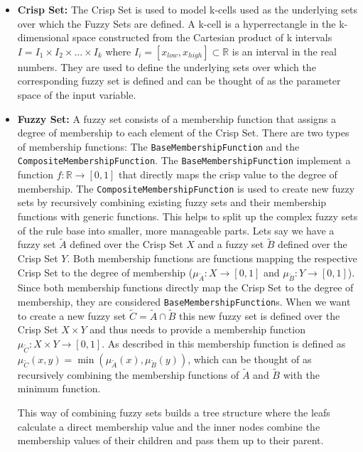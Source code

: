 \begin{itemize}
    \item \textbf{Crisp Set:} The Crisp Set is used to model k-cells used as the underlying sets over which the Fuzzy Sets are defined. A k-cell is a hyperrectangle in the k-dimensional space constructed from the Cartesian product of k intervals $I = I_1 \times I_2 \times \ldots \times I_k$ where $I_i = [x_{low}, x_{high}] \subset \mathbb{R} $ is an interval in the real numbers. They are used to define the underlying sets over which the corresponding fuzzy set is defined and can be thought of as the parameter space of the input variable.


    \item \textbf{Fuzzy Set:} A fuzzy set consists of a membership function that assigns a degree of membership to each element of the Crisp Set. There are two types of membership functions: The \texttt{BaseMembershipFunction} and the \texttt{CompositeMembershipFunction}. The \texttt{BaseMembershipFunction} implement a function $f: \mathbb{R} \rightarrow [0, 1]$ that directly maps the crisp value to the degree of membership. The \texttt{CompositeMembershipFunction} is used to create new fuzzy sets by recursively combining existing fuzzy sets and their membership functions with generic functions. This helps to split up the complex fuzzy sets of the rule base into smaller, more manageable parts. Lets say we have a fuzzy set $\tilde{A}$ defined over the Crisp Set $X$ and a fuzzy set $\tilde{B}$ defined over the Crisp Set $Y$. Both membership functions are functions mapping the respective Crisp Set to the degree of membership ($\mu_{\tilde{A}}: X \rightarrow [0, 1]$ and $\mu_{\tilde{B}}: Y \rightarrow [0, 1]$). Since both membership functions directly map the Crisp Set to the degree of membership, they are considered \texttt{BaseMembershipFunction}s. When we want to create a new fuzzy set $\tilde{C} = \tilde{A} \cap \tilde{B}$ this new fuzzy set is defined over the Crisp Set $X \times Y$  and thus needs to provide a membership function $\mu_{\tilde{C}}: X \times Y \rightarrow [0, 1]$. As described in  this membership function is defined as $\mu_{\tilde{C}}(x, y) = \min(\mu_{\tilde{A}}(x), \mu_{\tilde{B}}(y))$, which can be thought of as recursively combining the membership functions of $\tilde{A}$ and $\tilde{B}$ with the minimum function.

          This way of combining fuzzy sets builds a tree structure where the leafs calculate a direct membership value and the inner nodes combine the membership values of their children and pass them up to their parent.


\end{itemize}
